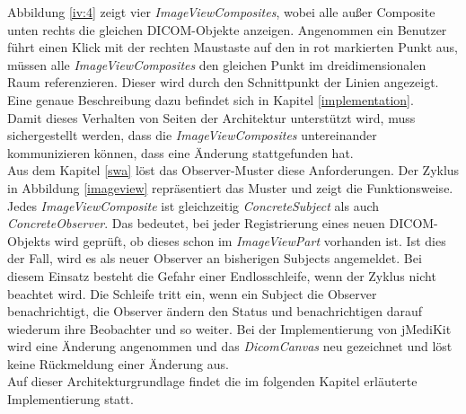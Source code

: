 Abbildung \ref{iv:4} zeigt vier \textit{ImageViewComposites}, wobei alle außer Composite unten rechts die gleichen DICOM-Objekte anzeigen.
Angenommen ein Benutzer führt einen Klick mit der rechten Maustaste auf den in rot markierten Punkt aus, müssen alle \textit{ImageViewComposites} den gleichen Punkt im dreidimensionalen Raum referenzieren. Dieser wird durch den Schnittpunkt der Linien angezeigt. Eine genaue Beschreibung dazu befindet sich in Kapitel \ref{implementation}.\\
Damit dieses Verhalten von Seiten der Architektur unterstützt wird, muss sichergestellt werden, dass die \textit{ImageViewComposites} untereinander kommunizieren können, dass eine Änderung stattgefunden hat.\\
Aus dem Kapitel \ref{swa} löst das Observer-Muster diese Anforderungen. Der Zyklus in Abbildung \ref{imageview} repräsentiert das Muster und zeigt die Funktionsweise. Jedes \textit{ImageView\-Composite} ist gleichzeitig \textit{ConcreteSubject} als auch \textit{ConcreteObserver}. Das bedeutet, bei jeder Registrierung eines neuen DICOM-Objekts wird geprüft, ob dieses schon im \textit{ImageViewPart} vorhanden ist. Ist dies der Fall, wird es als neuer Observer an bisherigen Subjects angemeldet.
Bei diesem Einsatz besteht die Gefahr einer Endlosschleife, wenn der Zyklus nicht beachtet wird. Die Schleife tritt ein, wenn ein Subject die Observer benachrichtigt, die Observer ändern den Status und benachrichtigen darauf wiederum ihre Beobachter und so weiter. Bei der Implementierung von jMediKit wird eine Änderung angenommen und das \textit{DicomCanvas} neu gezeichnet und löst keine Rückmeldung einer Änderung aus. \\
Auf dieser Architekturgrundlage findet die im folgenden Kapitel erläuterte Implementierung statt.